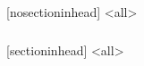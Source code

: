 
%
%
  [nosectioninhead]
\mode<all>
\begin{frame}
  \frametitle{\contentsname}
  \flushcolumns %
  \setlength{\columnsep}{0.2cm}%
  \begin{multicols}{2}
    \tableofcontents[hideallsubsections]
  \end{multicols}
\end{frame}
  [sectioninhead]
\mode<all>

%
%
